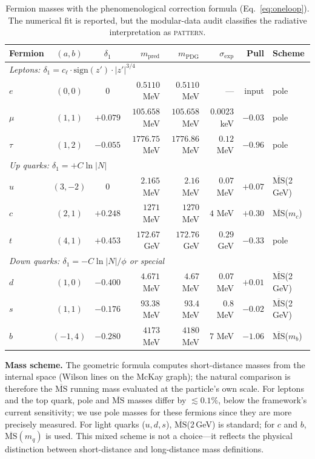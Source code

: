 \documentclass[12pt,a4paper]{article}
\theoremstyle{definition}
\begin{document}
\begin{table}[H]
\centering
\begin{tabular}{lccrrrrl}
\toprule
\textbf{Fermion} & $(a,b)$ & $\delta_1$ & $m_{\text{pred}}$ & $m_{\text{PDG}}$ & $\sigma_{\text{exp}}$ & \textbf{Pull} & \textbf{Scheme} \\
\midrule
\multicolumn{8}{l}{\textit{Leptons: $\delta_1 = c_\ell \cdot \mathrm{sign}(z') \cdot |z'|^{3/4}$}} \\
$e$   & $(0,0)$  & $0$      & $0.5110$ MeV  & $0.5110$ MeV  & ---          & input   & pole \\
$\mu$ & $(1,1)$  & $+0.079$ & $105.658$ MeV & $105.658$ MeV & $0.0023$ keV & $-0.03$ & pole \\
$\tau$& $(1,2)$  & $-0.055$ & $1776.75$ MeV & $1776.86$ MeV & $0.12$ MeV   & $-0.96$ & pole \\
\midrule
\multicolumn{8}{l}{\textit{Up quarks: $\delta_1 = +C\ln|N|$}} \\
$u$   & $(3,-2)$ & $0$      & $2.165$ MeV   & $2.16$ MeV    & $0.07$ MeV   & $+0.07$ & $\overline{\text{MS}}$(2\,GeV) \\
$c$   & $(2,1)$  & $+0.248$ & $1271$ MeV    & $1270$ MeV    & $4$ MeV      & $+0.30$ & $\overline{\text{MS}}$($m_c$) \\
$t$   & $(4,1)$  & $+0.453$ & $172.67$ GeV  & $172.76$ GeV  & $0.29$ GeV   & $-0.33$ & pole \\
\midrule
\multicolumn{8}{l}{\textit{Down quarks: $\delta_1 = -C\ln|N|/\phi$ or special}} \\
$d$   & $(1,0)$  & $-0.400$ & $4.671$ MeV   & $4.67$ MeV    & $0.07$ MeV   & $+0.01$ & $\overline{\text{MS}}$(2\,GeV) \\
$s$   & $(1,1)$  & $-0.176$ & $93.38$ MeV   & $93.4$ MeV    & $0.8$ MeV    & $-0.02$ & $\overline{\text{MS}}$(2\,GeV) \\
$b$   & $(-1,4)$ & $-0.280$ & $4173$ MeV    & $4180$ MeV    & $7$ MeV      & $-1.06$ & $\overline{\text{MS}}$($m_b$) \\
\bottomrule
\end{tabular}
\caption{Fermion masses with the phenomenological correction formula (Eq.~\eqref{eq:oneloop}).  The numerical fit is reported, but the modular-data audit classifies the radiative interpretation as \textsc{pattern}.}
\label{tab:corrected_masses_normlog}
\end{table}

\textbf{Mass scheme.}  The geometric formula computes short-distance masses from the internal space (Wilson lines on the McKay graph); the natural comparison is therefore the $\overline{\text{MS}}$ running mass evaluated at the particle's own scale.  For leptons and the top quark, pole and $\overline{\text{MS}}$ masses differ by $\lesssim 0.1\%$, below the framework's current sensitivity; we use pole masses for these fermions since they are more precisely measured.  For light quarks ($u, d, s$), $\overline{\text{MS}}$(2\,GeV) is standard; for $c$ and $b$, $\overline{\text{MS}}(m_q)$ is used.  This mixed scheme is not a choice---it reflects the physical distinction between short-distance and long-distance mass definitions.
\end{document}

